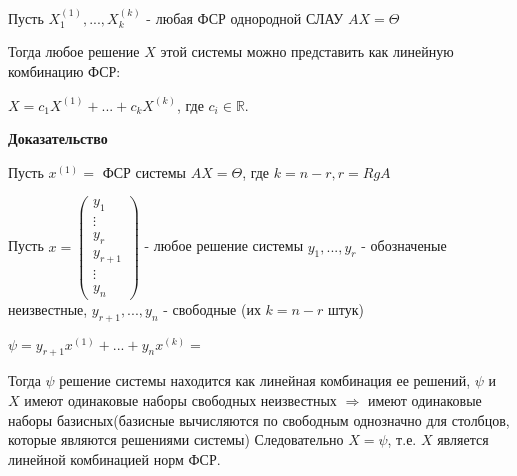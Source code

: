 \vspace*{15pt}

Пусть $X_1^{(1)}, ..., X_k^{(k)}$ - любая ФСР однородной СЛАУ $AX = \Theta$

Тогда любое решение $X$ этой системы можно представить как линейную комбинацию ФСР:

$X = c_1X^{(1)} + ... + c_kX^{(k)}$, где $c_i \in \mathbb{R}$.

\vspace*{15pt}

{\bf {Доказательство}}

Пусть $x^{(1)} = $ ФСР системы $AX = \Theta$, где $k = n - r, r = RgA$ 

Пусть $x = \begin{pmatrix}y_1\\\vdots\\y_r\\y_{r+1}\\\vdots\\y_n\end{pmatrix}$ - любое решение системы $y_1, ..., y_r$ - обозначеные неизвестные, $y_{r+1}, ..., y_n$ - свободные (их $k = n - r$ штук) 

$\psi = y_{r+1}x^{(1)}+...+y_nx^{(k)} = $

Тогда $\psi$ решение системы находится как линейная комбинация ее решений, $\psi$ и $X$ имеют одинаковые наборы свободных неизвестных $\Rightarrow$ имеют одинаковые наборы базисных(базисные вычисляются по свободным однозначно для столбцов, которые являются решениями системы) Следовательно $X = \psi$, т.е. $X$ является линейной комбинацией норм ФСР.

\ep

